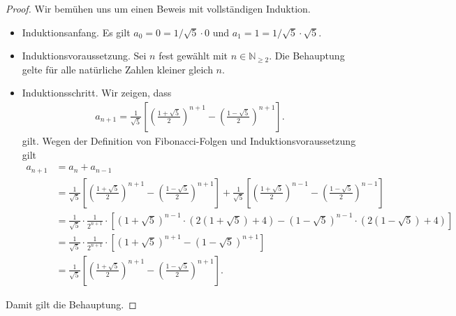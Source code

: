 \documentclass[draft,a5paper]{article}
\begin{document}
\begin{proof}
  Wir bemühen uns um einen Beweis mit vollständigen Induktion.

  \begin{itemize}
  \item Induktionsanfang.  Es gilt \(a_0 = 0 = 1/\sqrt{5} \cdot 0\) und
    \(a_1 = 1 = 1/\sqrt{5} \cdot \sqrt{5}\).
  \item Induktionsvoraussetzung.  Sei \(n\) fest gewählt mit
    \(n \in \mathbb{N}_{\ge 2}\).  Die Behauptung gelte für alle natürliche
    Zahlen kleiner gleich \(n\).
  \item Induktionsschritt. Wir zeigen, dass
    \begin{align*}
      a_{n+1} = \frac{1}{\sqrt{5}}
      \left[ \left( \frac{1 + \sqrt{5}}{2} \right)^{n+1}
      - \left( \frac{1 - \sqrt{5}}{2} \right)^{n+1} \right].
    \end{align*}
    gilt.  Wegen der Definition von Fibonacci-Folgen und
    Induktionsvoraussetzung gilt
    \begin{align*}
      a_{n+1}
      &= a_n + a_{n - 1} \\
      &= \frac{1}{\sqrt{5}}
        \left[ \left( \frac{1 + \sqrt{5}}{2} \right)^{n+1}
        - \left( \frac{1 - \sqrt{5}}{2} \right)^{n+1} \right]
      + \frac{1}{\sqrt{5}}
        \left[ \left( \frac{1 + \sqrt{5}}{2} \right)^{n-1}
        - \left( \frac{1 - \sqrt{5}}{2} \right)^{n-1} \right] \\
      &= \frac{1}{\sqrt{5}} \cdot \frac{1}{2^{n+1}} \cdot [(1 +
        \sqrt{5})^{n-1} \cdot (2 (1 + \sqrt{5}) + 4) - (1 -
        \sqrt{5})^{n-1} \cdot (2 (1 - \sqrt{5}) + 4)] \\
      &= \frac{1}{\sqrt{5}} \cdot \frac{1}{2^{n+1}} \cdot [(1 +
        \sqrt{5})^{n+1} - (1 - \sqrt{5})^{n+1}] \\
      &= \frac{1}{\sqrt{5}}
        \left[ \left( \frac{1 + \sqrt{5}}{2} \right)^{n+1}
        - \left( \frac{1 - \sqrt{5}}{2} \right)^{n+1} \right].
    \end{align*}
  \end{itemize}
  Damit gilt die Behauptung.
\end{proof}
\end{document}
